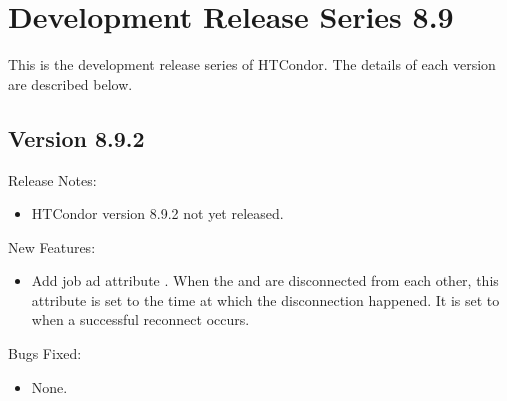 
\section{Development Release Series 8.9}\label{sec:History-8-9}

This is the development release series of HTCondor.
The details of each version are described below.

\subsection*{\label{sec:New-8-9-2}Version 8.9.2}

\noindent Release Notes:

\begin{itemize}

\item HTCondor version 8.9.2 not yet released.

\end{itemize}


\noindent New Features:

\begin{itemize}

\item Add job ad attribute .
When the  and  are disconnected from each
other, this attribute is set to the time at which the disconnection
happened.
It is set to  when a successful reconnect occurs.


\end{itemize}

\noindent Bugs Fixed:

\begin{itemize}

\item None.

\end{itemize}

